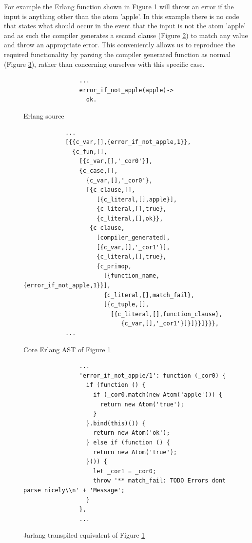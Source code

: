 \documentclass[twoside,12pt,titlepage,a4paper]{article}
\begin{document}
	For example the Erlang function shown in Figure \ref{fig:code_comparison:erl} will throw an error if the input is anything other than the atom 'apple'. In this example there is no code that states what should occur in the event that the input is not the atom 'apple' and as such the compiler generates a second clause (Figure \ref{fig:code_comparison:erl_ast}) to match any value and throw an appropriate error. This conveniently allows us to reproduce the required functionality by parsing the compiler generated function as normal (Figure \ref{fig:code_comparison:js}), rather than concerning ourselves with this specific case.
		\begin{figure}[t]
			\centering         
				\begin{verbatim}
				...
				error_if_not_apple(apple)->
				  ok.
				\end{verbatim}
			\caption{Erlang source}
			\label{fig:code_comparison:erl}
		\end{figure}
		\begin{figure}[t]
			\centering         
			\begin{verbatim}
			...
			[{{c_var,[],{error_if_not_apple,1}},
			  {c_fun,[],
			    [{c_var,[],'_cor0'}],
			    {c_case,[],
			      {c_var,[],'_cor0'},
			      [{c_clause,[],
			         [{c_literal,[],apple}],
			         {c_literal,[],true},
			         {c_literal,[],ok}},
			       {c_clause,
			         [compiler_generated],
			         [{c_var,[],'_cor1'}],
			         {c_literal,[],true},
			         {c_primop,
			           [{function_name,{error_if_not_apple,1}}],
			           {c_literal,[],match_fail},
			           [{c_tuple,[],
			             [{c_literal,[],function_clause},
			                {c_var,[],'_cor1'}]}]}}]}}},
			...
			\end{verbatim}
			\caption{Core Erlang AST of Figure \ref{fig:code_comparison:erl}}
			\label{fig:code_comparison:erl_ast}
		\end{figure}
		\begin{figure}[t]
			\centering
				\begin{verbatim}
				...
				'error_if_not_apple/1': function (_cor0) {
				  if (function () {
				    if (_cor0.match(new Atom('apple'))) {
				      return new Atom('true');
				    }
				  }.bind(this)()) {
				    return new Atom('ok');
				  } else if (function () {
				    return new Atom('true');
				  }()) {
				    let _cor1 = _cor0;
				    throw '** match_fail: TODO Errors dont parse nicely\\n' + 'Message';
				  }
				},
				...
				\end{verbatim}
			\caption{Jarlang transpiled equivalent of Figure \ref{fig:code_comparison:erl}}
			\label{fig:code_comparison:js}
		\end{figure}
	
\end{document}

